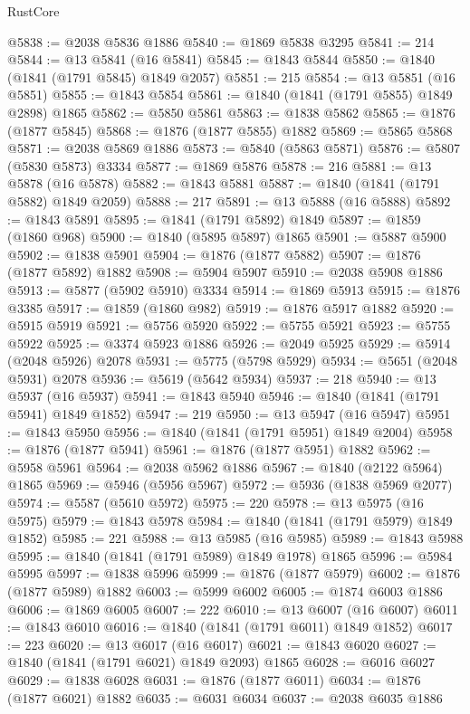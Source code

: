 \begin{lexlean}{RustCore}
\begin{coremodule}
@5838 := @2038 @5836 @1886
@5840 := @1869 @5838 @3295
@5841 := 214
@5844 := @13 @5841 (@16 @5841)
@5845 := @1843 @5844
@5850 := @1840 (@1841 (@1791 @5845) @1849 @2057)
@5851 := 215
@5854 := @13 @5851 (@16 @5851)
@5855 := @1843 @5854
@5861 := @1840 (@1841 (@1791 @5855) @1849 @2898) @1865
@5862 := @5850 @5861
@5863 := @1838 @5862
@5865 := @1876 (@1877 @5845)
@5868 := @1876 (@1877 @5855) @1882
@5869 := @5865 @5868
@5871 := @2038 @5869 @1886
@5873 := @5840 (@5863 @5871)
@5876 := @5807 (@5830 @5873) @3334
@5877 := @1869 @5876
@5878 := 216
@5881 := @13 @5878 (@16 @5878)
@5882 := @1843 @5881
@5887 := @1840 (@1841 (@1791 @5882) @1849 @2059)
@5888 := 217
@5891 := @13 @5888 (@16 @5888)
@5892 := @1843 @5891
@5895 := @1841 (@1791 @5892) @1849
@5897 := @1859 (@1860 @968)
@5900 := @1840 (@5895 @5897) @1865
@5901 := @5887 @5900
@5902 := @1838 @5901
@5904 := @1876 (@1877 @5882)
@5907 := @1876 (@1877 @5892) @1882
@5908 := @5904 @5907
@5910 := @2038 @5908 @1886
@5913 := @5877 (@5902 @5910) @3334
@5914 := @1869 @5913
@5915 := @1876 @3385
@5917 := @1859 (@1860 @982)
@5919 := @1876 @5917 @1882
@5920 := @5915 @5919
@5921 := @5756 @5920
@5922 := @5755 @5921
@5923 := @5755 @5922
@5925 := @3374 @5923 @1886
@5926 := @2049 @5925
@5929 := @5914 (@2048 @5926) @2078
@5931 := @5775 (@5798 @5929)
@5934 := @5651 (@2048 @5931) @2078
@5936 := @5619 (@5642 @5934)
@5937 := 218
@5940 := @13 @5937 (@16 @5937)
@5941 := @1843 @5940
@5946 := @1840 (@1841 (@1791 @5941) @1849 @1852)
@5947 := 219
@5950 := @13 @5947 (@16 @5947)
@5951 := @1843 @5950
@5956 := @1840 (@1841 (@1791 @5951) @1849 @2004)
@5958 := @1876 (@1877 @5941)
@5961 := @1876 (@1877 @5951) @1882
@5962 := @5958 @5961
@5964 := @2038 @5962 @1886
@5967 := @1840 (@2122 @5964) @1865
@5969 := @5946 (@5956 @5967)
@5972 := @5936 (@1838 @5969 @2077)
@5974 := @5587 (@5610 @5972)
@5975 := 220
@5978 := @13 @5975 (@16 @5975)
@5979 := @1843 @5978
@5984 := @1840 (@1841 (@1791 @5979) @1849 @1852)
@5985 := 221
@5988 := @13 @5985 (@16 @5985)
@5989 := @1843 @5988
@5995 := @1840 (@1841 (@1791 @5989) @1849 @1978) @1865
@5996 := @5984 @5995
@5997 := @1838 @5996
@5999 := @1876 (@1877 @5979)
@6002 := @1876 (@1877 @5989) @1882
@6003 := @5999 @6002
@6005 := @1874 @6003 @1886
@6006 := @1869 @6005
@6007 := 222
@6010 := @13 @6007 (@16 @6007)
@6011 := @1843 @6010
@6016 := @1840 (@1841 (@1791 @6011) @1849 @1852)
@6017 := 223
@6020 := @13 @6017 (@16 @6017)
@6021 := @1843 @6020
@6027 := @1840 (@1841 (@1791 @6021) @1849 @2093) @1865
@6028 := @6016 @6027
@6029 := @1838 @6028
@6031 := @1876 (@1877 @6011)
@6034 := @1876 (@1877 @6021) @1882
@6035 := @6031 @6034
@6037 := @2038 @6035 @1886

\end{coremodule}
\end{lexlean}
